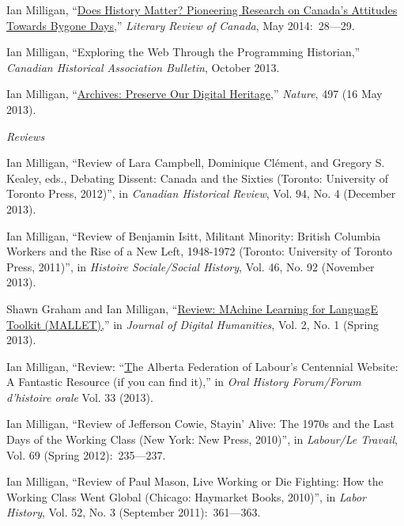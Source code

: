 \documentclass[11pt,article,oneside]{memoir}
\begin{document}
\ind Ian Milligan, ``\href{http://reviewcanada.ca/magazine/2014/05/does-history-matter/}{Does History Matter? Pioneering Research on Canada's Attitudes Towards Bygone Days},'' \emph{Literary Review of Canada}, May 2014:~28---29.

\ind Ian Milligan, ``Exploring the Web Through the Programming Historian,'' \emph{Canadian Historical Association Bulletin}, October 2013.

\ind Ian Milligan, ``\href{http://www.nature.com/nature/journal/v497/n7449/full/497317b.html}{Archives: Preserve Our Digital Heritage},'' \emph{Nature}, 497 (16 May 2013). 

\bigskip 

\noindent\emph{Reviews \vspace{0.05in}}


\ind Ian Milligan, ``Review of Lara Campbell, Dominique Cl\'ement, and Gregory S. Kealey, eds., Debating Dissent: Canada and the Sixties (Toronto: University of Toronto Press, 2012)'', in \emph{Canadian Historical Review}, Vol. 94, No. 4 (December 2013).

\ind Ian Milligan, ``Review of Benjamin Isitt, Militant Minority: British Columbia Workers and the Rise of a New Left, 1948-1972 (Toronto: University of Toronto Press, 2011)'', in \emph{Histoire Sociale/Social History}, Vol. 46, No. 92 (November 2013).

\ind Shawn Graham and Ian Milligan, ``\href{http://journalofdigitalhumanities.org/2-1/review-mallet-by-ian-milligan-and-shawn-graham/}{Review: MAchine Learning for LanguagE Toolkit (MALLET),}'' in \emph{Journal of Digital Humanities}, Vol. 2, No. 1 (Spring 2013).

\ind Ian Milligan, ``Review: ``\href{http://www.oralhistoryforum.ca/index.php/ohf/article/view/467/545}The Alberta Federation of Labour's Centennial Website: A Fantastic Resource (if you can find it),'' in \emph{Oral History Forum/Forum d'histoire orale} Vol. 33 (2013).

\ind Ian Milligan, ``Review of Jefferson Cowie, Stayin' Alive: The 1970s and the Last Days of the Working Class (New York: New Press, 2010)'', in \emph{Labour/Le Travail}, Vol. 69 (Spring 2012):~235---237.

\ind Ian Milligan, ``Review of Paul Mason, Live Working or Die Fighting: How the Working Class Went Global (Chicago: Haymarket Books, 2010)'', in \emph{Labor History}, Vol. 52, No. 3 (September 2011):~361---363.
\end{document}
